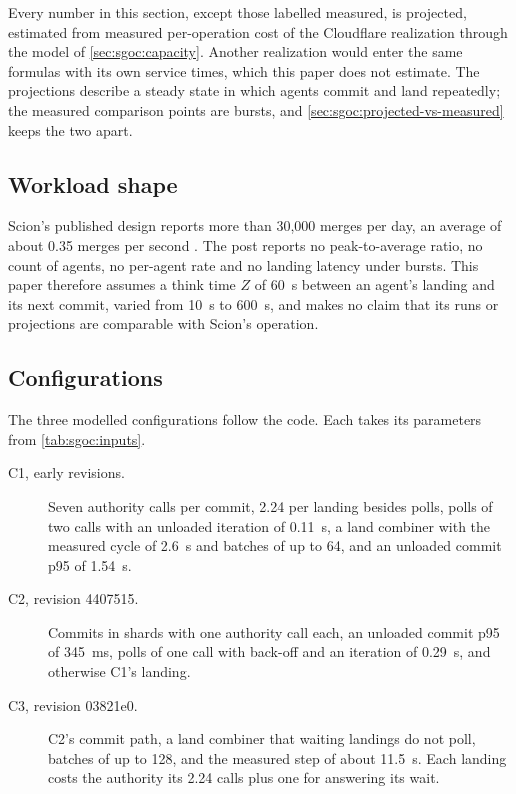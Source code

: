 \documentclass[11pt,letterpaper]{article}
\theoremstyle{definition}
\theoremstyle{remark}
\begin{document}
Every number in this section, except those labelled measured, is projected, estimated from measured per-operation cost of the Cloudflare realization through the model of \cref{sec:sgoc:capacity}. Another realization would enter the same formulas with its own service times, which this paper does not estimate. The projections describe a steady state in which agents commit and land repeatedly; the measured comparison points are bursts, and \cref{sec:sgoc:projected-vs-measured} keeps the two apart.

\subsection{Workload shape}

Scion's published design reports more than 30,000 merges per day, an average of about 0.35 merges per second \cite{anthropic2026scion}. %
The post reports no peak-to-average ratio, no count of agents, no per-agent rate and no landing latency under bursts. This paper therefore assumes a think time $Z$ of 60~s between an agent's landing and its next commit, varied from 10~s to 600~s, and makes no claim that its runs or projections are comparable with Scion's operation.

\subsection{Configurations}

The three modelled configurations follow the code. Each takes its parameters from \cref{tab:sgoc:inputs}.

\begin{description}
\item[C1, early revisions.] Seven authority calls per commit, 2.24 per landing besides polls, polls of two calls with an unloaded iteration of 0.11~s, a land combiner with the measured cycle of 2.6~s and batches of up to 64, and an unloaded commit p95 of 1.54~s.
\item[C2, revision 4407515.] Commits in shards with one authority call each, an unloaded commit p95 of 345~ms, polls of one call with back-off and an iteration of 0.29~s, and otherwise C1's landing.
\item[C3, revision 03821e0.] C2's commit path, a land combiner that waiting landings do not poll, batches of up to 128, and the measured step of about 11.5~s. Each landing costs the authority its 2.24 calls plus one for answering its wait.
\end{description}
\end{document}
